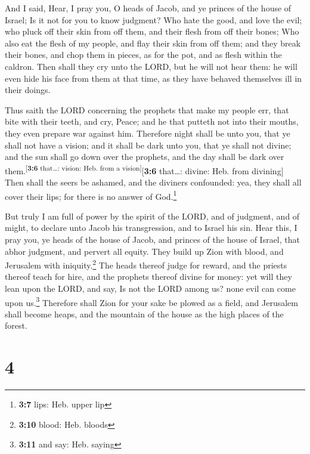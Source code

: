  And I said, Hear, I pray you, O heads of Jacob, and ye
princes of the house of Israel; Is it not for you to know judgment?
 Who hate the good, and love the evil; who pluck off their
skin from off them, and their flesh from off their bones; 
Who also eat the flesh of my people, and flay their skin from off them;
and they break their bones, and chop them in pieces, as for the pot, and
as flesh within the caldron.  Then shall they cry unto the
LORD, but he will not hear them: he will even hide his face from them at
that time, as they have behaved themselves ill in their doings.

 Thus saith the LORD concerning the prophets that make my
people err, that bite with their teeth, and cry, Peace; and he that
putteth not into their mouths, they even prepare war against him.
 Therefore night shall be unto you, that ye shall not have
a vision; and it shall be dark unto you, that ye shall not divine; and
the sun shall go down over the prophets, and the day shall be dark over
them.\textsuperscript{{[}\textbf{3:6} that\ldots: vision: Heb. from a
vision{]}}{[}\textbf{3:6} that\ldots: divine: Heb. from divining{]}
 Then shall the seers be ashamed, and the diviners
confounded: yea, they shall all cover their lips; for there is no answer
of God.\footnote{\textbf{3:7} lips: Heb. upper lip}

 But truly I am full of power by the spirit of the LORD,
and of judgment, and of might, to declare unto Jacob his transgression,
and to Israel his sin.  Hear this, I pray you, ye heads of
the house of Jacob, and princes of the house of Israel, that abhor
judgment, and pervert all equity.  They build up Zion
with blood, and Jerusalem with iniquity.\footnote{\textbf{3:10} blood:
  Heb. bloods}  The heads thereof judge for reward, and
the priests thereof teach for hire, and the prophets thereof divine for
money: yet will they lean upon the LORD, and say, Is not the LORD among
us? none evil can come upon us.\footnote{\textbf{3:11} and say: Heb.
  saying}  Therefore shall Zion for your sake be plowed
as a field, and Jerusalem shall become heaps, and the mountain of the
house as the high places of the forest.

\hypertarget{section-3}{%
\section{4}\label{section-3}}

